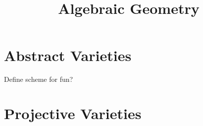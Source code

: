 \documentclass[11pt]{scrreprt}
\begin{document}
\title{Algebraic Geometry}
\maketitle

\chapter{Abstract Varieties}
Define scheme for fun?

\chapter{Projective Varieties}
\end{document}
